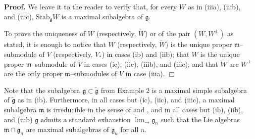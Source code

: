 \documentclass[oneside,leqno,12pt]{article}
\newenvironment{proof}{ \noindent \textbf{Proof.}}{\hfill $\Box$}
\def\gg{\mathfrak{g}}
\def\gm{\mathfrak{m}}
\renewcommand{\gg}{\mathfrak{g}}
\newcommand{\Stab}{\mathrm{Stab}}
\newcommand{\inj}{\displaystyle \lim_\to}
\begin{document}
\begin{proof}
We leave it to the reader to verify that, for every $W$ as in (iiia), (iiib), and (iiic), $\Stab_\gg W$  is a maximal subalgebra of $\gg$.

To prove the uniqueness of $W$ (respectively, $\tilde{W}$) or of the pair $(W, W^\perp)$ as stated,  it is enough to notice that $W$ (respectively, $\tilde{W}$)
is the unique proper $\gm$--submodule of $V$ (respectively, $V_*$) in cases (ib) and (iib); that $W$ 
is the unique proper $\gm$--submodule of $V$ in cases (ic), (iic), (iiib), and (iiic); and that $W$ are $W^\perp$ are the only proper
$\gm$--submodules of $V$ in case (iiia).
\end{proof}

Note that the subalgebra $\gg \subset \tilde{\gg}$ from Example 2  is a maximal simple subalgebra of $\tilde{\gg}$ as in (ib).
Furthermore, in all cases but (ic), (iic), and (iiic), a maximal subalgebra $\gm$ is irreducible in the sense of \cite{LP} and \cite{BS},
and in all cases but (ib),  (iib), and (iiib) $\gg$ admits a standard exhaustion $\inj \gg_n$ such that the Lie algebras $\gm \cap \gg_n$
are maximal subalgebras of $\gg_n$ for all $n$.  
\end{document}
